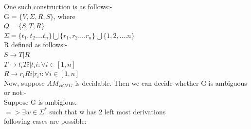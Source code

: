 \documentclass{article}
\begin{document}
One such construction is as follows:- \\

G = $\{ V,\Sigma, R, S \}$, where \\
$Q = \{S, T, R\}$\\
$\Sigma = \{t_1, t_2 .... t_n\} \bigcup \{r_1, r_2 .... r_n\} \bigcup \{1,2,....n\}$\\
R defined as follows:- \\
$S \rightarrow T | R$\\
$T \rightarrow t_iTi | t_i i :  \forall i \in [1,n] $\\
$R \rightarrow r_iRi | r_i i :  \forall i \in [1,n] $\\

Now, suppose $AM_{BCFG}$ is decidable. Then we can decide whether G is ambiguous or not:- \\
Suppose G is ambigious.\\
$=> \exists w \in \Sigma^* $ such that w has 2 left most derivations\\
following cases are possible:- 
\end{document}
